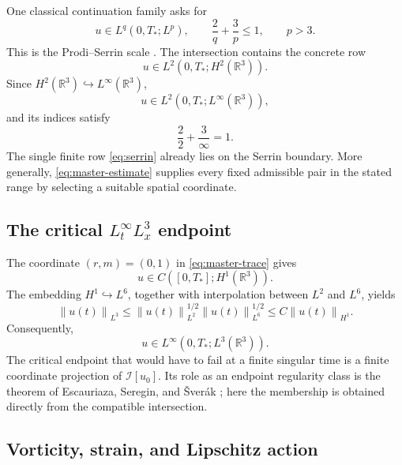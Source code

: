 \documentclass[11pt,letterpaper]{article}
\theoremstyle{definition}
\theoremstyle{remark}
\newcommand{\R}{\mathbb R}
\newcommand{\cI}{\mathcal I}
\newcommand{\norm}[1]{\left\lVert #1\right\rVert}
\begin{document}
One classical continuation family asks for
\[
u\in L^q(0,T_*;L^p),
\qquad
\frac2q+\frac3p\le1,
\qquad p>3.
\]
This is the Prodi--Serrin scale \cite{Prodi1959,Serrin1962,Serrin1963}.
The intersection contains the concrete row
\[
u\in L^2(0,T_*;H^2(\R^3)).
\]
Since \(H^2(\R^3)\hookrightarrow L^\infty(\R^3)\),
\begin{equation}
\boxed{u\in L^2(0,T_*;L^\infty(\R^3)),}
\label{eq:serrin}
\end{equation}
and its indices satisfy
\[
\frac22+\frac3\infty=1.
\]
The single finite row \eqref{eq:serrin} already lies on the Serrin boundary.
More generally, \eqref{eq:master-estimate} supplies every fixed admissible
pair in the stated range by selecting a suitable spatial coordinate.

\subsection{The critical
\texorpdfstring{\(L_t^\infty L_x^3\)}{L-infinity in time, L3 in space}
endpoint}

The coordinate \((r,m)=(0,1)\) in \eqref{eq:master-trace} gives
\[
u\in C([0,T_*];H^1(\R^3)).
\]
The embedding \(H^1\hookrightarrow L^6\), together with interpolation
between \(L^2\) and \(L^6\), yields
\[
\norm{u(t)}_{L^3}
\le \norm{u(t)}_{L^2}^{1/2}\norm{u(t)}_{L^6}^{1/2}
\le C\norm{u(t)}_{H^1}.
\]
Consequently,
\begin{equation}
\boxed{u\in L^\infty(0,T_*;L^3(\R^3)).}
\label{eq:critical-l3}
\end{equation}
The critical endpoint that would have to fail at a finite singular time is a
finite coordinate projection of \(\cI[u_0]\).  Its role as an endpoint
regularity class is the theorem of Escauriaza, Seregin, and \v{S}ver\'ak
\cite{EscauriazaSereginSverak2003}; here the membership is obtained directly
from the compatible intersection.

\subsection{Vorticity, strain, and Lipschitz action}
\end{document}
